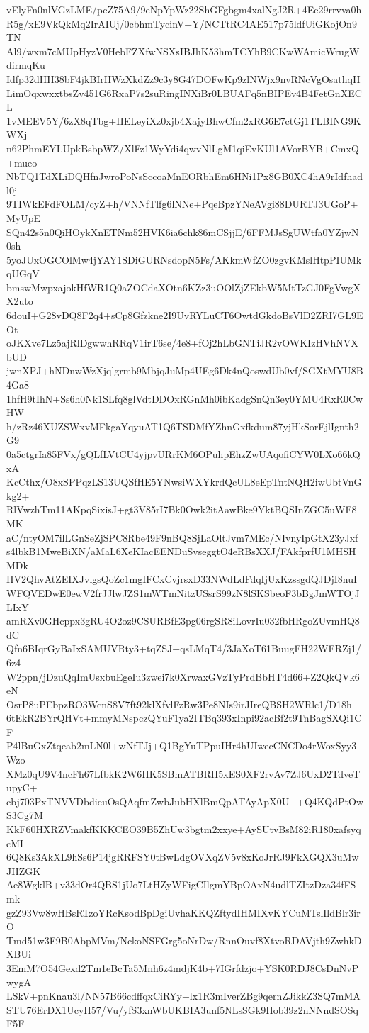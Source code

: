 vElyFn0nlVGzLME/pcZ75A9/9eNpYpWz22ShGFgbgm4xalNgJ2R+4Ee29rrvva0h
R5g/xE9VkQkMq2IrAIUj/0cbhmTycinV+Y/NCTtRC4AE517p75ldfUiGKojOn9TN
Al9/wxm7cMUpHyzV0HebFZXfwNSXsIBJhK53hmTCYhB9CKwWAmicWrugWdirmqKu
Idfp32dHH38bF4jkBIrHWzXkdZz9c3y8G47DOFwKp9zlNWjx9nvRNcVgOsathqII
LimOqxwxxtbsZv451G6RxaP7s2suRingINXiBr0LBUAFq5nBIPEv4B4FetGnXECL
1vMEEV5Y/6zX8qTbg+HELeyiXz0xjb4XajyBhwCfm2xRG6E7ctGj1TLBING9KWXj
n62PhmEYLUpkBsbpWZ/XlFz1WyYdi4qwvNlLgM1qiEvKUl1AVorBYB+CmxQ+mueo
NbTQ1TdXLiDQHfnJwroPoNsSccoaMnEORbhEm6HNi1Px8GB0XC4hA9rIdfhadl0j
9TIWkEFdFOLM/cyZ+h/VNNfTlfg6lNNe+PqeBpzYNeAVgi88DURTJ3UGoP+MyUpE
SQn42s5n0QiHOykXnETNm52HVK6ia6chk86mCSjjE/6FFMJsSgUWtfa0YZjwN0sh
5yoJUxOGCOlMw4jYAY1SDiGURNsdopN5Fs/AKkmWfZO0zgvKMslHtpPIUMkqUGqV
bmswMwpxajokHfWR1Q0aZOCdaXOtn6KZz3uOOlZjZEkbW5MtTzGJ0FgVwgXX2uto
6douI+G28vDQ8F2q4+sCp8Gfzkne2I9UvRYLuCT6OwtdGkdoBsVlD2ZRI7GL9EOt
oJKXve7Lz5ajRlDgwwhRRqV1irT6se/4e8+fOj2hLbGNTiJR2vOWKIzHVhNVXbUD
jwnXPJ+hNDnwWzXjqlgrmb9MbjqJuMp4UEg6Dk4nQoswdUb0vf/SGXtMYU8B4Ga8
1hfH9tIhN+Ss6h0Nk1SLfq8glVdtDDOxRGnMh0ibKadgSnQn3ey0YMU4RxR0CwHW
h/zRz46XUZSWxvMFkgaYqyuAT1Q6TSDMfYZhnGxfkdum87yjHkSorEjlIgnth2G9
0a5ctgrIa85FVx/gQLfLVtCU4yjpvURrKM6OPuhpEhzZwUAqofiCYW0LXo66kQxA
KcCthx/O8xSPPqzLS13UQSfHE5YNwsiWXYkrdQcUL8eEpTntNQH2iwUbtVnGkg2+
RlVwzhTm11AKpqSixisJ+gt3V85rI7Bk0Owk2itAawBke9YktBQSInZGC5uWF8MK
aC/ntyOM7ilLGnSeZjSPC8Rbe49F9nBQ8SjLaOltJvm7MEc/NIvnyIpGtX23yJxf
s4lbkB1MweBiXN/aMaL6XeKIacEENDuSvseggtO4eRBsXXJ/FAkfprfU1MHSHMDk
HV2QhvAtZEIXJvlgsQoZc1mgIFCxCvjrsxD33NWdLdFdqIjUxKzssgdQJDjI8nuI
WFQVEDwE0ewV2frJJlwJZS1mWTmNitzUSsrS99zN8lSKSbeoF3bBgJmWTOjJLIxY
amRXv0GHcppx3gRU4O2oz9CSURBfE3pg06rgSR8iLovrIu032fbHRgoZUvmHQ8dC
Qfn6BIqrGyBaIxSAMUVRty3+tqZSJ+qsLMqT4/3JaXoT61BuugFH22WFRZj1/6z4
W2ppn/jDzuQqImUsxbuEgeIu3zwei7k0XrwaxGVzTyPrdBbHT4d66+Z2QkQVk6eN
OsrP8uPEbpzRO3WcnS8V7ft92klXfvlFzRw3Pe8NIs9irJIreQBSH2WRlc1/D18h
6tEkR2BYrQHVt+mmyMNspczQYuF1ya2ITBq393xInpi92acBf2t9TnBagSXQi1CF
P4lBuGxZtqeab2mLN0l+wNfTJj+Q1BgYuTPpuIHr4hUIwecCNCDo4rWoxSyy3Wzo
XMz0qU9V4ncFh67LfbkK2W6HK5SBmATBRH5xES0XF2rvAv7ZJ6UxD2TdveTupyC+
cbj703PxTNVVDbdieuOsQAqfmZwbJubHXlBmQpATAyApX0U++Q4KQdPtOwS3Cg7M
KkF60HXRZVmakfKKKCEO39B5ZhUw3bgtm2xxye+AySUtvBsM82iR180xafsyqcMI
6Q8Ks3AkXL9hSs6P14jgRRFSY0tBwLdgOVXqZV5v8xKoJrRJ9FkXGQX3uMwJHZGK
Ae8WgklB+v33dOr4QBS1jUo7LtHZyWFigCIlgmYBpOAxN4udlTZItzDza34fFSmk
gzZ93Vw8wHBsRTzoYRcKsodBpDgiUvhaKKQZftydIHMIXvKYCuMTslIldBlr3irO
Tmd51w3F9B0AbpMVm/NckoNSFGrg5oNrDw/RnnOuvf8XtvoRDAVjth9ZwhkDXBUi
3EmM7O54Gexd2Tm1eBcTa5Mnh6z4mdjK4b+7IGrfdzjo+YSK0RDJ8CsDnNvPwygA
LSkV+pnKnau3l/NN57B66cdffqxCiRYy+lx1R3mIverZBg9qernZJikkZ3SQ7mMA
STU76ErDX1UcyH57/Vu/yfS3xnWbUKBIA3unf5NLsSGk9Hob39z2nNNndSOSqF5F
